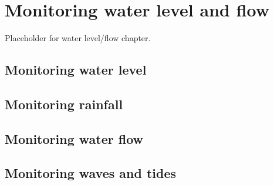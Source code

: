 \setchapterpreamble[u]{\margintoc}
\chapter{\color{gray} Monitoring water level and flow \color{black}}

Placeholder for water level/flow chapter.

\section{\color{gray} Monitoring water level \color{black}}

\section{\color{gray} Monitoring rainfall \color{black}}

\section{\color{gray} Monitoring water flow \color{black}}

\section{\color{gray} Monitoring waves and tides \color{black}}
